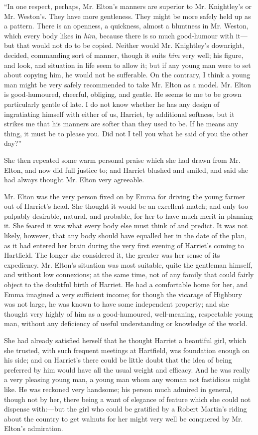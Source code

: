 “In one respect, perhaps, Mr. Elton's manners are superior to Mr. Knightley's or Mr. Weston's. They have more gentleness. They might be more safely held up as a pattern. There is an openness, a quickness, almost a bluntness in Mr. Weston, which every body likes in {\em him}, because there is so much good-humour with it---but that would not do to be copied. Neither would Mr. Knightley's downright, decided, commanding sort of manner, though it suits {\em him} very well; his figure, and look, and situation in life seem to allow it; but if any young man were to set about copying him, he would not be sufferable. On the contrary, I think a young man might be very safely recommended to take Mr. Elton as a model. Mr. Elton is good-humoured, cheerful, obliging, and gentle. He seems to me to be grown particularly gentle of late. I do not know whether he has any design of ingratiating himself with either of us, Harriet, by additional softness, but it strikes me that his manners are softer than they used to be. If he means any thing, it must be to please you. Did not I tell you what he said of you the other day?”

She then repeated some warm personal praise which she had drawn from Mr. Elton, and now did full justice to; and Harriet blushed and smiled, and said she had always thought Mr. Elton very agreeable.

Mr. Elton was the very person fixed on by Emma for driving the young farmer out of Harriet's head. She thought it would be an excellent match; and only too palpably desirable, natural, and probable, for her to have much merit in planning it. She feared it was what every body else must think of and predict. It was not likely, however, that any body should have equalled her in the date of the plan, as it had entered her brain during the very first evening of Harriet's coming to Hartfield. The longer she considered it, the greater was her sense of its expediency. Mr. Elton's situation was most suitable, quite the gentleman himself, and without low connexions; at the same time, not of any family that could fairly object to the doubtful birth of Harriet. He had a comfortable home for her, and Emma imagined a very sufficient income; for though the vicarage of Highbury was not large, he was known to have some independent property; and she thought very highly of him as a good-humoured, well-meaning, respectable young man, without any deficiency of useful understanding or knowledge of the world.

She had already satisfied herself that he thought Harriet a beautiful girl, which she trusted, with such frequent meetings at Hartfield, was foundation enough on his side; and on Harriet's there could be little doubt that the idea of being preferred by him would have all the usual weight and efficacy. And he was really a very pleasing young man, a young man whom any woman not fastidious might like. He was reckoned very handsome; his person much admired in general, though not by her, there being a want of elegance of feature which she could not dispense with:---but the girl who could be gratified by a Robert Martin's riding about the country to get walnuts for her might very well be conquered by Mr. Elton's admiration.

